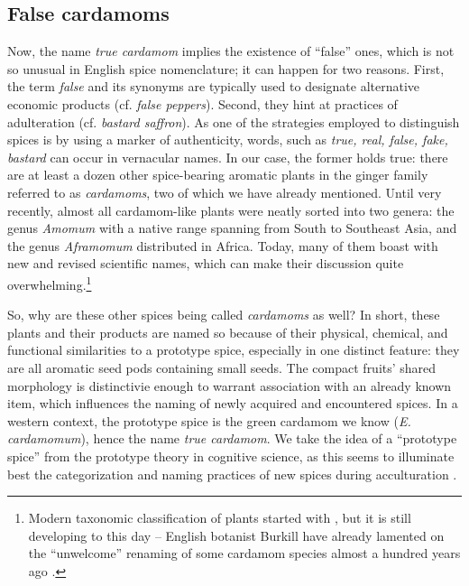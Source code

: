 \documentclass[12pt]{article}
\begin{document}

\subsection{False cardamoms}

Now, the name \textit{true cardamom} implies the existence of ``false'' ones, which is not so unusual in English spice nomenclature; it can happen for two reasons. First, the term \textit{false} and its synonyms are typically used to designate alternative economic products (cf. \textit{false peppers}). Second, they hint at practices of adulteration (cf. \textit{bastard saffron}). As one of the strategies employed to distinguish spices is by using a marker of authenticity, words, such as \textit{true, real, false, fake, bastard} can occur in vernacular names. In our case, the former holds true: there are at least a dozen other spice-bearing aromatic plants in the ginger family referred to as \textit{cardamoms}, two of which we have already mentioned. Until very recently, almost all cardamom-like plants were neatly sorted into two genera: the genus \textit{Amomum} with a native range spanning from South to Southeast Asia, and the genus \textit{Aframomum} distributed in Africa. Today, many of them boast with new and revised scientific names, which can make their discussion quite overwhelming.\footnote{Modern taxonomic classification of plants started with \textcite{linnaeus_1758_systema}, but it is still developing to this day -- English botanist Burkill have already lamented on the ``unwelcome'' renaming of some cardamom species almost a hundred years ago \parencite[see][]{burkill_1930_cardamoms}.}

So, why are these other spices being called \textit{cardamoms} as well? In short, these plants and their products are named so because of their physical, chemical, and functional similarities to a prototype spice, especially in one distinct feature: they are all aromatic seed pods containing small seeds. The compact fruits' shared morphology is distinctivie enough to warrant association with an already known item, which influences the naming of newly acquired and encountered spices. In a western context, the prototype spice is the green cardamom we know (\textit{E. cardamomum}), hence the name \textit{true cardamom}. We take the idea of a ``prototype spice'' from the prototype theory in cognitive science, as this seems to illuminate best the categorization and naming practices of new spices during acculturation \parencite[see][]{parti_2023_mapping}.
\end{document}
